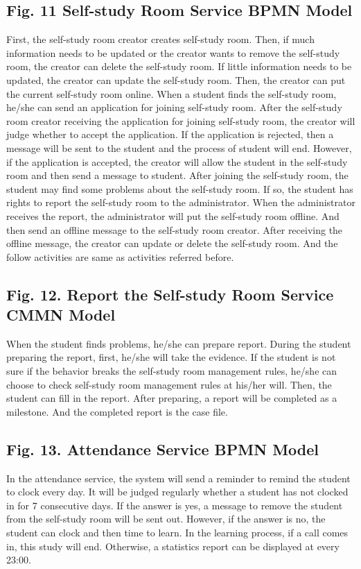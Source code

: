 \documentclass[runningheads]{llncs}
\begin{document}
\subsection{Fig. 11  Self-study Room Service BPMN Model}
First, the self-study room creator creates self-study room. Then, if much information needs to be updated or the creator wants to remove the self-study room, the creator can delete the self-study room. If little information needs to be updated, the creator can update the self-study room. Then, the creator can put the current self-study room online. When a student finds the self-study room, he/she can send an application for joining self-study room. After the self-study room creator receiving the application for joining self-study room, the creator will judge whether to accept the application. If the application is rejected, then a message will be sent to the student and the process of student will end. However, if the application is accepted, the creator will allow the student in the self-study room and then send a message to student. After joining the self-study room, the student may find some problems about the self-study room. If so, the student has rights to report the self-study room to the administrator. When the administrator receives the report, the administrator will put the self-study room offline. And then send an offline message to the self-study room creator. After receiving the offline message, the creator can update or delete the self-study room. And the follow activities are same as activities referred before.
\subsection{Fig. 12. Report the Self-study Room Service CMMN Model}
When the student finds problems, he/she can prepare report. During the student preparing the report, first, he/she will take the evidence. If the student is not sure if the behavior breaks the self-study room management rules, he/she can choose to check self-study room management rules at his/her will. Then, the student can fill in the report. After preparing, a report will be completed as a milestone. And the completed report is the case file. 
\subsection{Fig. 13. Attendance Service BPMN Model}
In the attendance service, the system will send a reminder to remind the student to clock every day. It will be judged regularly whether a student has not clocked in for 7 consecutive days. If the answer is yes, a message to remove the student from the self-study room will be sent out. However, if the answer is no, the student can clock and then time to learn. In the learning process, if a call comes in, this study will end. Otherwise, a statistics report can be displayed at every 23:00.
\end{document}
